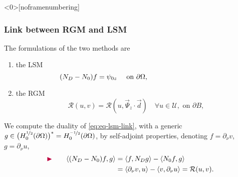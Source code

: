 \documentclass[10pt,xcolor={dvipsnames}]{beamer}
\theoremstyle{plain}
\theoremstyle{plain}
\begin{document}
\begin{frame}<0>[noframenumbering]
 \frametitle{Link between RGM and LSM}
 {
 \footnotesize
 The formulations of the two methods are}
 \begin{enumerate}
  \item the LSM
  \vspace{-0.1cm}
  \begin{equation}
  \label{eq:eq-lsm-link}
  \hspace{-3.3cm}
  ({N_D} - {N_0})f = \psi_{0z} \quad \text{ on }\partial \Omega,
  \end{equation}
  \item the RGM
  \vspace{-0.1cm}
  \begin{equation}
   \mathcal{R}(u, v) = \mathcal{R}(u, \vec{\Psi}_z\cdot\vec{d})\quad \forall u \in \mathcal{U}, 
    \text{ on }\partial B,
  \end{equation}
 \end{enumerate}
% 
{\footnotesize
We compute the duality of \eqref{eq:eq-lsm-link}, with a generic 
${g \in \bigl(H^{\nicefrac{1}{2}}_0(\partial \Omega)\bigr)^* = H^{\nicefrac{-1}{2}}_0(\partial \Omega)}$, by self-adjoint properties, 
denoting $f=\partial_\nu v$, $g=\partial_\nu u$,}
{\small
\begin{align*}
 \label{eq:link-duality-left}
 &{\color{purple}\blacktriangleright }&\quad\langle({N_D} - {N_0})f,g\rangle & =  \langle f,{N_D} g\rangle - \langle {N_0} f,g\rangle \\
                                        &&& = \langle \partial_\nu v,u\rangle - \langle v,\partial_\nu u\rangle
                                        = \mathcal{R}(u,v).\\

\end{align*}}
\end{frame}
\end{document}
